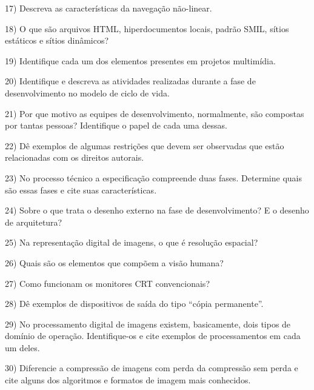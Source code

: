\documentclass[a4paper,11pt]{article}
\begin{document}
\vspace{0.25cm}

17) Descreva as características da navegação não-linear.

\vspace{0.25cm}

18) O que são arquivos HTML, hiperdocumentos locais, padrão SMIL, sítios
estáticos e sítios dinâmicos?

\vspace{0.25cm}

19) Identifique cada um dos elementos presentes em projetos multimídia.

\vspace{0.25cm}

20) Identifique e descreva as atividades realizadas durante a fase de
desenvolvimento no modelo de ciclo de vida.

\vspace{0.25cm}

21) Por que motivo as equipes de desenvolvimento, normalmente, são compostas por
tantas pessoas? Identifique o papel de cada uma dessas.

\vspace{0.25cm}

22) Dê exemplos de algumas restrições que devem ser observadas que estão
relacionadas com os direitos autorais.

\vspace{0.25cm}

23) No processo técnico a especificação compreende duas fases. Determine quais
são essas fases e cite suas características.

\vspace{0.25cm}

24) Sobre o que trata o desenho externo na fase de desenvolvimento? E o desenho
de arquitetura?

\vspace{0.25cm}

25) Na representação digital de imagens, o que é resolução espacial?

\vspace{0.25cm}

26) Quais são os elementos que compõem a visão humana?

\vspace{0.25cm}

27) Como funcionam os monitores CRT convencionais?

\vspace{0.25cm}

28) Dê exemplos de dispositivos de saída do tipo ``cópia permanente''.

\vspace{0.25cm}

29) No processamento digital de imagens existem, basicamente, dois tipos de
domínio de operação. Identifique-os e cite exemplos de processamentos em cada um
deles.

\vspace{0.25cm}

30) Diferencie a compressão de imagens com perda da compressão sem perda e cite
alguns dos algoritmos e formatos de imagem mais conhecidos.
\end{document}
